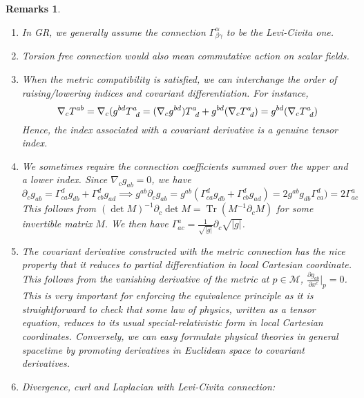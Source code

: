 \documentclass[a4paper]{article}
\DeclareMathOperator{\Tr}{Tr}
\newtheorem{remarks}{Remarks}[section]
\theoremstyle{new}
\begin{document}
\begin{remarks}\leavevmode
\begin{enumerate}
\item In GR, we generally assume the connection $\Gamma_{\beta\gamma}^\alpha$ to be the Levi-Civita one.
\item Torsion free connection would also mean commutative action on scalar fields.
\item When the metric compatibility is satisfied, we can interchange the order of raising/lowering indices and covariant differentiation. For instance,
$$\nabla_cT^{ab}=\nabla_c(g^{bd}\tensor*{T}{*_{}^{a}_{d}}=(\nabla_cg^{bd})\tensor*{T}{*_{}^{a}_{d}}+g^{bd}(\nabla_c\tensor*{T}{*_{}^{a}_{d}})=g^{bd}(\nabla_c\tensor*{T}{*_{}^{a}_{d}})$$
Hence, the index associated with a covariant derivative is a genuine tensor index.
\item We sometimes require the connection coefficients summed over the upper and a lower index. Since $\nabla_cg_{ab}=0$, we have
$$\partial_cg_{ab}=\Gamma^d_{ca}g_{db}+\Gamma^d_{cb}g_{ad}\implies g^{ab}\partial_cg_{ab}=g^{ab}(\Gamma^d_{ca}g_{db}+\Gamma^d_{cb}g_{ad})=2g^{ab}g_{db}\Gamma^d_{ca})=2\Gamma^a_{ac}$$
This follows from $(\det M)^{-1}\partial_c\det M=\Tr(M^{-1}\partial_cM)$ for some invertible matrix $M$. We then have $\Gamma_{ac}^a=\frac{1}{\sqrt{|g|}}\partial_c\sqrt{|g|}$. 
\item The covariant derivative constructed with the metric connection has the nice property that it reduces to partial differentiation in local Cartesian coordinate. This follows from the vanishing derivative of the metric at $p\in\mathcal{M}$, $\frac{\partial g_{ab}}{\partial x^c}|_p=0$. This is very important for enforcing the equivalence principle as it is straightforward to check that some law of physics, written as a tensor equation, reduces to its usual special-relativistic form in local Cartesian coordinates. Conversely, we can easy formulate physical theories in general spacetime by promoting derivatives in Euclidean space to covariant derivatives.
\item Divergence, curl and Laplacian with Levi-Civita connection:
\end{enumerate}
\end{remarks}
\newpage
\end{document}
